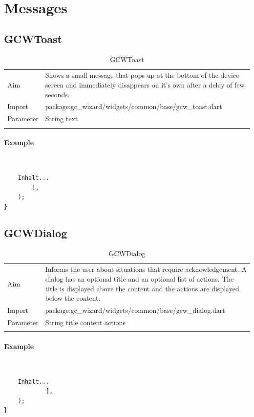 \newpage
\section{Messages}
\subsection{GCWToast}
\label{fig: GCWToast}
\begin{table}[H]
\begin{tabular}[h]{p{2cm}p{9cm}}
    \caption{GCWToast}
    Aim       & Shows a small message that pops up at the bottom of the device screen and immediately disappears on it’s own after a delay of few seconds.\\
    Import    & package:gc\_wizard/widgets/common/base/gcw\_toast.dart\\
    Parameter & String text \\
    \label{tab:GCWToast}
\end{tabular}
\end{table}
\paragraph*{Example} \,
\begin{lstlisting}
    Inhalt...
        ],
    );
}
\end{lstlisting}
\label{fig: ExampleGCWToastr}

\newpage
\subsection{GCWDialog}
\label{fig: GCWDialog}
\begin{table}[H]
\begin{tabular}{p{2cm}p{9cm}}
    \caption{GCWDialog}
    Aim         & Informs the user about situations that require acknowledgement. A dialog has an optional title and an optional list of actions. The title is displayed above the content and the actions are displayed below the content.\\
    Import      & package:gc\_wizard/widgets/common/base/gcw\_dialog.dart\\
    Parameter   & String title\newline
                  content\newline
                  actions\\
    \label{tab:GCWDialog}
\end{tabular}
\end{table}
\paragraph*{Example} \,
\begin{lstlisting}
    Inhalt...
            ],
    );
}

\end{lstlisting}
\label{fig: ExampleGCWDialogr}
